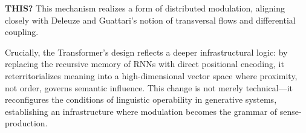 




\begin{orangebox}
	\textbf{THIS?}
	This mechanism realizes a form of distributed modulation, aligning closely with Deleuze and Guattari’s notion of transversal flows and differential coupling.


	Crucially, the Transformer’s design reflects a deeper infrastructural logic: by replacing the recursive memory of RNNs with direct positional encoding, it reterritorializes meaning into a high-dimensional vector space where proximity, not order, governs semantic influence. This change is not merely technical—it reconfigures the conditions of linguistic operability in generative systems, establishing an infrastructure where modulation becomes the grammar of sense-production.
\end{orangebox}









